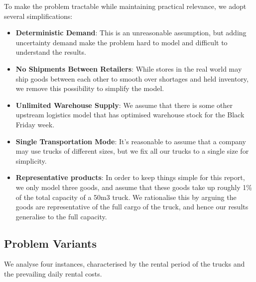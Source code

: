 \documentclass[a4paper,12pt]{article}
\begin{document}
To make the problem tractable while maintaining practical relevance, we adopt several simplifications:

\begin{itemize}
    \item \textbf{Deterministic Demand}: This is an unreasonable assumption, but adding uncertainty demand make the problem hard to model and difficult to understand the results.

    \item \textbf{No Shipments Between Retailers}: While stores in the real world may ship goods between each other to smooth over shortages and held inventory, we remove this possibility to simplify the model.

    \item \textbf{Unlimited Warehouse Supply}: We assume that there is some other upstream logistics model that has optimised warehouse stock for the Black Friday week.

    \item \textbf{Single Transportation Mode}: It's reasonable to assume that a company may use trucks of different sizes, but we fix all our trucks to a single size for simplicity.

    \item \textbf{Representative products}: In order to keep things simple for this report, we only model three goods, and assume that these goods take up roughly 1\% of the total capacity of a 50m3 truck.
    We rationalise this by arguing the goods are representative of the full cargo of the truck, and hence our results generalise to the full capacity.
\end{itemize}


\subsection{Problem Variants}\label{subsec:problem-variants}

We analyse four instances, characterised by the rental period of the trucks and the prevailing daily rental costs.
\end{document}
